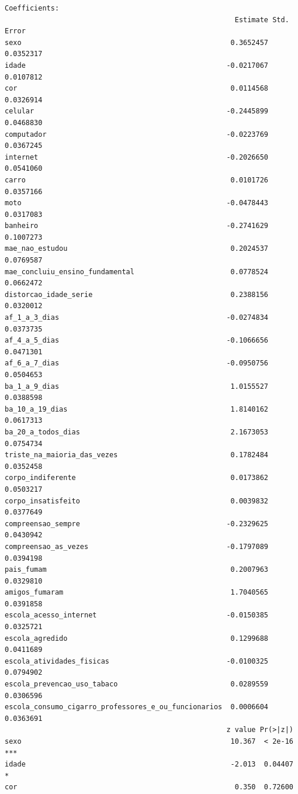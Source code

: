 \documentclass[
]{article}
\begin{document}
\begin{verbatim}
Coefficients:
                                                       Estimate Std. Error
sexo                                                  0.3652457  0.0352317
idade                                                -0.0217067  0.0107812
cor                                                   0.0114568  0.0326914
celular                                              -0.2445899  0.0468830
computador                                           -0.0223769  0.0367245
internet                                             -0.2026650  0.0541060
carro                                                 0.0101726  0.0357166
moto                                                 -0.0478443  0.0317083
banheiro                                             -0.2741629  0.1007273
mae_nao_estudou                                       0.2024537  0.0769587
mae_concluiu_ensino_fundamental                       0.0778524  0.0662472
distorcao_idade_serie                                 0.2388156  0.0320012
af_1_a_3_dias                                        -0.0274834  0.0373735
af_4_a_5_dias                                        -0.1066656  0.0471301
af_6_a_7_dias                                        -0.0950756  0.0504653
ba_1_a_9_dias                                         1.0155527  0.0388598
ba_10_a_19_dias                                       1.8140162  0.0617313
ba_20_a_todos_dias                                    2.1673053  0.0754734
triste_na_maioria_das_vezes                           0.1782484  0.0352458
corpo_indiferente                                     0.0173862  0.0503217
corpo_insatisfeito                                    0.0039832  0.0377649
compreensao_sempre                                   -0.2329625  0.0430942
compreensao_as_vezes                                 -0.1797089  0.0394198
pais_fumam                                            0.2007963  0.0329810
amigos_fumaram                                        1.7040565  0.0391858
escola_acesso_internet                               -0.0150385  0.0325721
escola_agredido                                       0.1299688  0.0411689
escola_atividades_fisicas                            -0.0100325  0.0794902
escola_prevencao_uso_tabaco                           0.0289559  0.0306596
escola_consumo_cigarro_professores_e_ou_funcionarios  0.0006604  0.0363691
                                                     z value Pr(>|z|)    
sexo                                                  10.367  < 2e-16 ***
idade                                                 -2.013  0.04407 *  
cor                                                    0.350  0.72600    

\end{verbatim}
\end{document}
